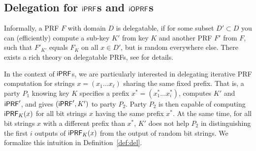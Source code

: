 \subsection{Delegation for $\mathsf{i}\mathsf{PRF}$s and $\mathsf{i}\mathsf{OPRF}$s}
Informally, a PRF $F$ with domain $D$ is delegatable, if for some
subset $D'\subset{}D$ you can (efficiently) compute a sub-key $K'$
from key $K$ and another PRF $F'$ from $F$, such that $F'_{K'}$ equals
$F_K$ on all $x\in{}D'$, but is random everywhere else. There exists a
rich theory on delegatable PRFs, see \citet{delegate} for details.

In the context of $\mathsf{i}\mathsf{PRF}$s, we are particularly interested in
delegating iterative PRF computation for strings
$x=(x_1\ldots{}x_\ell)$ sharing the same fixed prefix. That is, a
party $P_1$ knowing key $K$ specifies a prefix
$x^*=(x^*_1\ldots{}x^*_i)$, computes $K'$ and $\mathsf{i}\mathsf{PRF}'$, and gives
$(\mathsf{i}\mathsf{PRF}',K')$ to party $P_2$. Party $P_2$ is then capable of computing
$\mathsf{i}\mathsf{PRF}_K(x)$ for all bit strings $x$ having the same prefix $x^*$. At
the same time, for all bit strings $x$ with a different prefix than
$x^*$, $K'$ does not help $P_2$ in distinguishing the first $i$
outputs of $\mathsf{i}\mathsf{PRF}_{{K}}(x)$ from the output of random bit strings.  We
formalize this intuition in Definition~\ref{def:del}.

